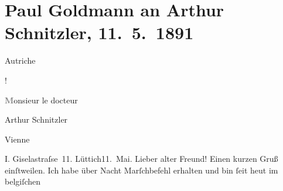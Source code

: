 

         
         \renewcommand{\erwaehntePersonen}{Personen: Paul Goldmann, Clementine Goldmann, Vally Rosengart}
         \renewcommand{\erwaehnteInstitutionen}{Institutionen: Heilsarmee}
         \renewcommand{\erwaehnteOrte}{Orte: Belgien, Brüssel, Bösendorferstraße, Lüttich, Wien, Österreich}
         \renewcommand{\erwaehnteWerke}{}
               \section[Paul Goldmann an Arthur Schnitzler, 11. 5. 1891]{ Paul Goldmann an Arthur Schnitzler, 11. 5. 1891}\nopagebreak{}\rehead{ }\begin{ledgroupsized}[t]{13cm}\normalsize\beginnumbering \toendnotes[C]{\smallbreak\pagebreak[2]} 
\toendnotes[C]{\smallbreak}\pstart{}{\pb}\begin{otherlanguage}{french}Autriche\end{otherlanguage}! \pend{}\pstart{}\begin{otherlanguage}{french}\textcolor{gray}{\textbf{M}}onsieur le docteur\end{otherlanguage} Arthur
                  Schnitzler\pend{}\pstart{}\begin{otherlanguage}{french}Vienne\end{otherlanguage}\pend{}\pstart{}I. Giselastraſse 11. \pend{}{\bigskip}\pstart
           \noindent{}{\pb}Lüttich11. Mai. Lieber alter Freund! Einen
               kurzen Gruß einſtweilen. Ich habe über Nacht Marſchbefehl erhalten und bin ſeit heut im belgiſchen\label{K_L02662-1v}
\end{ledgroupsized}
